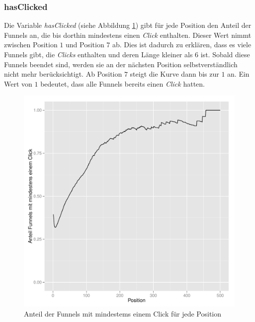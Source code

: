 \subsubsection*{hasClicked}
Die Variable \textit{hasClicked} (siehe Abbildung \ref{hasClicked}) gibt für jede Position den Anteil der Funnels an, die bis dorthin mindestens einen \textit{Click} enthalten. Dieser Wert nimmt zwischen Position $1$ und Position $7$ ab. Dies ist dadurch zu erklären, dass es viele Funnels gibt, die \textit{Clicks} enthalten und deren Länge kleiner als $6$ ist. Sobald diese Funnels beendet sind, werden sie an der nächsten Position selbstverständlich nicht mehr berücksichtigt. Ab Position $7$ steigt die Kurve dann bis zur $1$ an. Ein Wert von $1$ bedeutet, dass alle Funnels bereits einen \textit{Click} hatten.
\begin{figure}[H]
    \centering
    \includegraphics[scale=0.5]{hasClickedSucc.pdf}
    \caption[Anteil Funnels mit mindestens einem Click]{Anteil der Funnels mit mindestems einem Click für jede Position}
    \label{hasClicked}
\end{figure}

